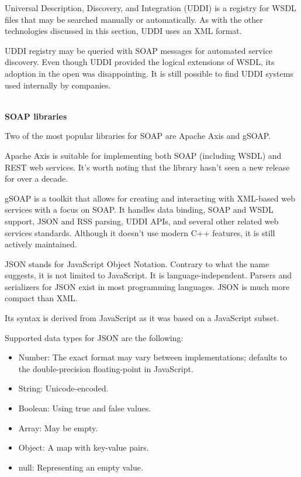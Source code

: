 Universal Description, Discovery, and Integration (UDDI) is a registry for WSDL files that may be searched manually or automatically. As with the other technologies discussed in this section, UDDI uses an XML format.

UDDI registry may be queried with SOAP messages for automated service discovery. Even though UDDI provided the logical extensions of WSDL, its adoption in the open was disappointing. It is still possible to find UDDI systems used internally by companies.

\hspace*{\fill} \\ %
\noindent
\textbf{SOAP libraries}

Two of the most popular libraries for SOAP are Apache Axis and gSOAP.

Apache Axis is suitable for implementing both SOAP (including WSDL) and REST web services. It's worth noting that the library hasn't seen a new release for over a decade.

gSOAP is a toolkit that allows for creating and interacting with XML-based web services with a focus on SOAP. It handles data binding, SOAP and WSDL support, JSON and RSS parsing, UDDI APIs, and several other related web services standards. Although it doesn't use modern C++ features, it is still actively maintained.


JSON stands for JavaScript Object Notation. Contrary to what the name suggests, it is not limited to JavaScript. It is language-independent. Parsers and serializers for JSON exist in most programming languages. JSON is much more compact than XML.

Its syntax is derived from JavaScript as it was based on a JavaScript subset.

Supported data types for JSON are the following:

\begin{itemize}
\item 
Number: The exact format may vary between implementations; defaults to the double-precision floating-point in JavaScript.

\item 
String: Unicode-encoded.

\item 
Boolean: Using true and false values.

\item 
Array: May be empty.

\item 
Object: A map with key-value pairs.

\item 
null: Representing an empty value.
\end{itemize}

